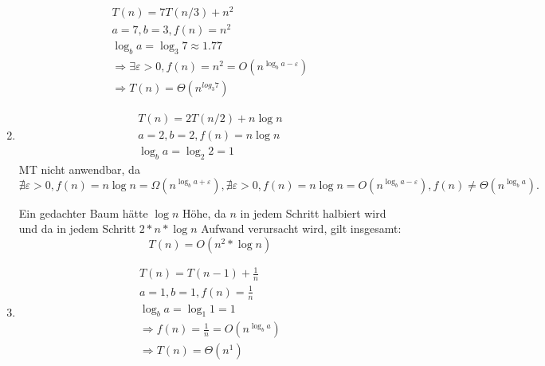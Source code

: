\documentclass[a4paper,10pt]{scrartcl}
\begin{document}
\begin{enumerate}
\begin{align}
	T(n) = 7T(n/3) + n^2 \\
	a = 7, b = 3, f(n) = n^2 \\
	\log _b a = \log _3 7 \approx 1.77 \\
	\Rightarrow \exists \varepsilon > 0, f(n) = n^2 = O(n^{\log _b a-\varepsilon}) \\
	\Rightarrow T(n) = \Theta(n^{log _3 7}) \tag{Fall 1 des Master-Theorems}
	\end{align}
\item	\begin{align}
	T(n) = 2T(n/2) + n \log n \\
	a = 2, b = 2, f(n) = n \log n \\
	\log _b a = \log _2 2 = 1
	\end{align}
	MT nicht anwendbar, da $\nexists \varepsilon > 0, f(n) = n \log
	n = \Omega(n^{\log _b a+\varepsilon}), \nexists \varepsilon > 0,
	f(n) = n \log n = O(n^{\log _b a-\varepsilon}), f(n) \neq
	\Theta(n^{\log _b a}).$


	Ein gedachter Baum hätte $\log n$ Höhe, da $n$ in jedem Schritt halbiert wird und da in jedem Schritt $2 * n * \log n$ Aufwand verursacht wird, gilt insgesamt:
\[ T(n) = O(n^2 * \log n)\]
\item	\begin{align}
	T(n) = T(n-1) + \frac{1}{n} \\
	a = 1, b = 1, f(n) = \frac{1}{n} \\
	\log _b a = \log _1 1 = 1 \\
	\Rightarrow f(n) = \frac{1}{n} = O(n^{\log _b a}) \\
	\Rightarrow T(n) = \Theta(n^1) \tag{Fall 1 des Master-Theorems}
	\end{align}
\end{enumerate}
\end{document}
